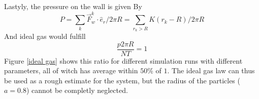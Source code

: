 \documentclass{article}
\begin{document}
        Lastyly, the pressure on the wall is given By
        \begin{equation*}
            P = \sum_k \vec F_w^{k} \cdot \hat e_r / 2 \pi R = \sum_{r_k>R} K(r_k - R) / 2 \pi R
        \end{equation*}
        And ideal gas would fulfill
        \begin{equation*}
            \frac{p2\pi R}{N T} = 1
        \end{equation*}
        Figure \ref{ideal gas} shows this ratio for different simulation runs with different parameters, all of witch has average within $50\%$ of $1$. The ideal gas law can thus be used as a rough estimate for the system, but the radius of the particles ($a = 0.8$) cannot be completly neglected.
\end{document}
